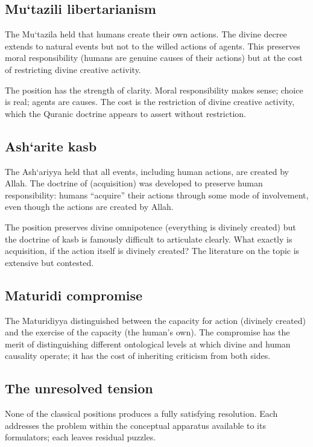\subsection{Mu`tazili libertarianism}

The Mu`tazila held that humans create their own actions. The
divine decree extends to natural events but not to the willed
actions of agents. This preserves moral responsibility (humans
are genuine causes of their actions) but at the cost of
restricting divine creative activity.

The position has the strength of clarity. Moral responsibility
makes sense; choice is real; agents are causes. The cost is the
restriction of divine creative activity, which the Quranic doctrine
appears to assert without restriction.

\subsection{Ash`arite kasb}

The Ash`ariyya held that all events, including human actions, are
created by Allah. The doctrine of  (acquisition) was
developed to preserve human responsibility: humans ``acquire''
their actions through some mode of involvement, even though the
actions are created by Allah.

The position preserves divine omnipotence (everything is divinely
created) but the doctrine of kasb is famously difficult to
articulate clearly. What exactly is acquisition, if the action
itself is divinely created? The literature on the topic is
extensive but contested.

\subsection{Maturidi compromise}

The Maturidiyya distinguished between the capacity for action
(divinely created) and the exercise of the capacity (the human's
own). The compromise has the merit of distinguishing different
ontological levels at which divine and human causality operate;
it has the cost of inheriting criticism from both sides.

\subsection{The unresolved tension}

None of the classical positions produces a fully satisfying
resolution. Each addresses the problem within the conceptual
apparatus available to its formulators; each leaves residual
puzzles.

